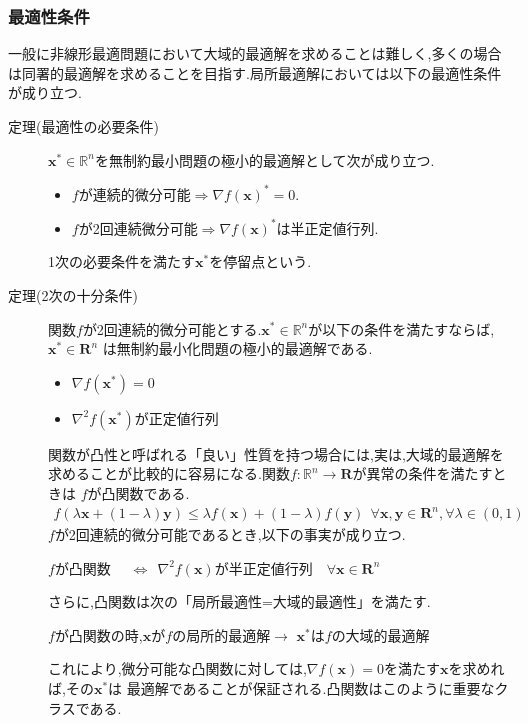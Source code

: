\documentclass[12pt]{jarticle}
\begin{document}
\clearpage
\subsubsection{最適性条件}
一般に非線形最適問題において大域的最適解を求めることは難しく,多くの場合は同署的最適解を求めることを目指す.局所最適解においては以下の最適性条件が成り立つ.
\begin{description}
    \item[定理(最適性の必要条件)] $\boldsymbol{x}^*\in \mathbb{R}^n $を無制約最小問題の極小的最適解として次が成り立つ.
          \begin{itemize}
              \item $f$が連続的微分可能$\Rightarrow \nabla f(\boldsymbol{x})^*=0$.
              \item $f$が2回連続微分可能$\Rightarrow \nabla f(\boldsymbol{x})^*$は半正定値行列.
          \end{itemize}
          1次の必要条件を満たす$\boldsymbol{x}^*$を停留点という.
    \item[定理(2次の十分条件)] 関数$f$が2回連続的微分可能とする.$\boldsymbol{x}^*\in \mathbb{R}^n$が以下の条件を満たすならば,$\boldsymbol{x}^*\in \boldsymbol{R}^n$
          は無制約最小化問題の極小的最適解である.
          \begin{itemize}
              \item $\nabla f(\boldsymbol{x}^*)=0$
              \item $\nabla^2f(\boldsymbol{x}^*)$が正定値行列
          \end{itemize}
          関数が凸性と呼ばれる「良い」性質を持つ場合には,実は,大域的最適解を求めることが比較的に容易になる.関数$f:\mathbb{R}^n \rightarrow \boldsymbol{R}$が異常の条件を満たすときは
          $f$が凸関数である.
          \begin{eqnarray}
              f(\lambda\boldsymbol{x}+(1-\lambda)\boldsymbol{y})\leq \lambda f(\boldsymbol{x})+(1-\lambda)f(\boldsymbol{y})\ \ \forall \boldsymbol{x},\boldsymbol{y}\in \boldsymbol{R}^n,\forall \lambda\in(0,1)\nonumber
          \end{eqnarray}
          $f$が2回連続的微分可能であるとき,以下の事実が成り立つ.
          \begin{center}
              $f$が凸関数 \ \ $\Leftrightarrow\ \ \nabla^2f(\boldsymbol{x})$が半正定値行列\ \ $\forall \boldsymbol{x}\in \boldsymbol{R}^n$
          \end{center}
          さらに,凸関数は次の「局所最適性=大域的最適性」を満たす.
          \begin{center}
              $f$が凸関数の時,$\boldsymbol{x}$が$f$の局所的最適解$\rightarrow$ $\boldsymbol{x}^*$は$f$の大域的最適解
          \end{center}
          これにより,微分可能な凸関数に対しては,$\nabla f(\boldsymbol{x})=0$を満たす$\boldsymbol{x}$を求めれば,その$\boldsymbol{x}^*$は
          最適解であることが保証される.凸関数はこのように重要なクラスである.
\end{description}
\end{document}
